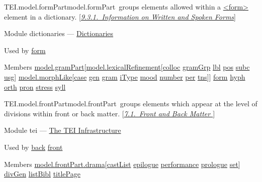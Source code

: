 \begin{reflist}
\item[]\begin{specHead}{TEI.model.formPart}{model.formPart} groups elements allowed within a \hyperref[TEI.form]{<form>} element in a dictionary. [\textit{\hyperref[DITPFO]{9.3.1.\ Information on Written and Spoken Forms}}]\end{specHead} 
    \item[{Module}]
  dictionaries — \hyperref[DI]{Dictionaries}
    \item[{Used by}]
  \hyperref[TEI.form]{form}
    \item[{Members}]
  \hyperref[TEI.model.gramPart]{model.gramPart}[\hyperref[TEI.model.lexicalRefinement]{model.lexicalRefinement}[\hyperref[TEI.colloc]{colloc} \hyperref[TEI.gramGrp]{gramGrp} \hyperref[TEI.lbl]{lbl} \hyperref[TEI.pos]{pos} \hyperref[TEI.subc]{subc} \hyperref[TEI.usg]{usg}] \hyperref[TEI.model.morphLike]{model.morphLike}[\hyperref[TEI.case]{case} \hyperref[TEI.gen]{gen} \hyperref[TEI.gram]{gram} \hyperref[TEI.iType]{iType} \hyperref[TEI.mood]{mood} \hyperref[TEI.number]{number} \hyperref[TEI.per]{per} \hyperref[TEI.tns]{tns}]] \hyperref[TEI.form]{form} \hyperref[TEI.hyph]{hyph} \hyperref[TEI.orth]{orth} \hyperref[TEI.pron]{pron} \hyperref[TEI.stress]{stress} \hyperref[TEI.syll]{syll}
\end{reflist}  
\begin{reflist}
\item[]\begin{specHead}{TEI.model.frontPart}{model.frontPart} groups elements which appear at the level of divisions within front or back matter. [\textit{\hyperref[DRFAB]{7.1.\ Front and Back Matter }}]\end{specHead} 
    \item[{Module}]
  tei — \hyperref[ST]{The TEI Infrastructure}
    \item[{Used by}]
  \hyperref[TEI.back]{back} \hyperref[TEI.front]{front}
    \item[{Members}]
  \hyperref[TEI.model.frontPart.drama]{model.frontPart.drama}[\hyperref[TEI.castList]{castList} \hyperref[TEI.epilogue]{epilogue} \hyperref[TEI.performance]{performance} \hyperref[TEI.prologue]{prologue} \hyperref[TEI.set]{set}] \hyperref[TEI.divGen]{divGen} \hyperref[TEI.listBibl]{listBibl} \hyperref[TEI.titlePage]{titlePage}
\end{reflist}  
